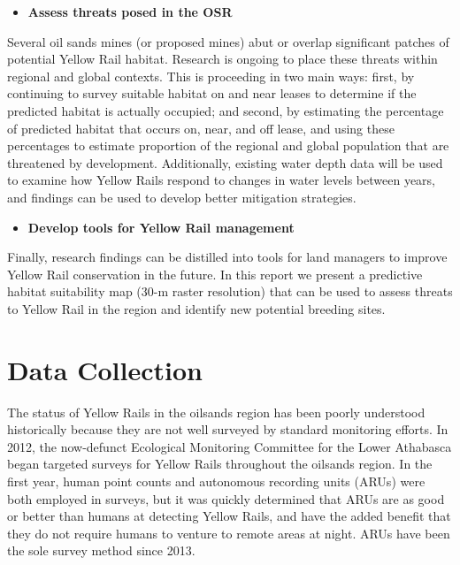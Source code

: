 \documentclass[11pt,]{article}
\providecommand{\tightlist}{%
  \setlength{\itemsep}{0pt}\setlength{\parskip}{0pt}}
\begin{document}
\begin{itemize}
\tightlist
\item
  \textbf{Assess threats posed in the OSR}
\end{itemize}

Several oil sands mines (or proposed mines) abut or overlap significant
patches of potential Yellow Rail habitat. Research is ongoing to place
these threats within regional and global contexts. This is proceeding in
two main ways: first, by continuing to survey suitable habitat on and
near leases to determine if the predicted habitat is actually occupied;
and second, by estimating the percentage of predicted habitat that
occurs on, near, and off lease, and using these percentages to estimate
proportion of the regional and global population that are threatened by
development. Additionally, existing water depth data will be used to
examine how Yellow Rails respond to changes in water levels between
years, and findings can be used to develop better mitigation strategies.

\begin{itemize}
\tightlist
\item
  \textbf{Develop tools for Yellow Rail management}
\end{itemize}

Finally, research findings can be distilled into tools for land managers
to improve Yellow Rail conservation in the future. In this report we
present a predictive habitat suitability map (30-m raster resolution)
that can be used to assess threats to Yellow Rail in the region and
identify new potential breeding sites.

\section{Data Collection}\label{data-collection}

The status of Yellow Rails in the oilsands region has been poorly
understood historically because they are not well surveyed by standard
monitoring efforts. In 2012, the now-defunct Ecological Monitoring
Committee for the Lower Athabasca began targeted surveys for Yellow
Rails throughout the oilsands region. In the first year, human point
counts and autonomous recording units (ARUs) were both employed in
surveys, but it was quickly determined that ARUs are as good or better
than humans at detecting Yellow Rails, and have the added benefit that
they do not require humans to venture to remote areas at night. ARUs
have been the sole survey method since 2013.
\end{document}
